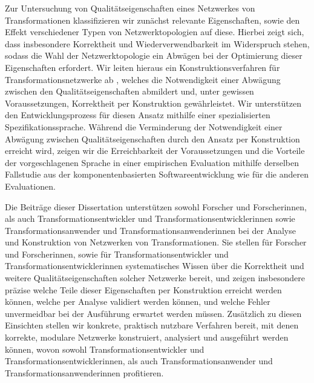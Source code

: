 Zur Untersuchung von Qualitätseigenschaften eines Netzwerkes von Transformationen klassifizieren wir zunächst relevante Eigenschaften, sowie den Effekt verschiedener Typen von Netzwerktopologien auf diese. %
Hierbei zeigt sich, dass insbesondere Korrektheit und Wiederverwendbarkeit im Widerspruch stehen, sodass die Wahl der Netzwerktopologie ein Abwägen bei der Optimierung dieser Eigenschaften erfordert.
Wir leiten hieraus ein Konstruktionsverfahren für Transformationsnetzwerke ab%
, welches die Notwendigkeit einer Abwägung zwischen den Qualitätseigenschaften abmildert und, unter gewissen Voraussetzungen, Korrektheit per Konstruktion gewährleistet. %
Wir unterstützen den Entwicklungsprozess für diesen Ansatz mithilfe einer spezialisierten Spezifikationssprache.
Während die Verminderung der Notwendigkeit einer Abwägung zwischen Qualitätseigenschaften durch den Ansatz per Konstruktion erreicht wird, zeigen wir die Erreichbarkeit der Voraussetzungen und die Vorteile der vorgeschlagenen Sprache in einer empirischen Evaluation mithilfe derselben Fallstudie aus der komponentenbasierten Softwareentwicklung wie für die anderen Evaluationen.

Die Beiträge dieser Dissertation unterstützen sowohl Forscher und Forscherinnen, als auch Transformationsentwickler und Transformationsentwicklerinnen sowie Transformationsanwender und Transformationsanwenderinnen bei der Analyse und Konstruktion von Netzwerken von Transformationen. %
Sie stellen für Forscher und Forscherinnen, sowie für Transformationsentwickler und Transformationsentwicklerinnen systematisches Wissen über die Korrektheit und weitere Qualitätseigenschaften solcher Netzwerke bereit, und zeigen insbesondere präzise welche Teile dieser Eigenschaften per Konstruktion erreicht werden können, welche per Analyse validiert werden können, und welche Fehler unvermeidbar bei der Ausführung erwartet werden müssen.
Zusätzlich zu diesen Einsichten stellen wir konkrete, praktisch nutzbare Verfahren bereit, mit denen korrekte, modulare Netzwerke konstruiert, analysiert und ausgeführt werden können, wovon sowohl Transformationsentwickler und Transformationsentwicklerinnen, als auch Transformationsanwender und Transformationsanwenderinnen profitieren.

